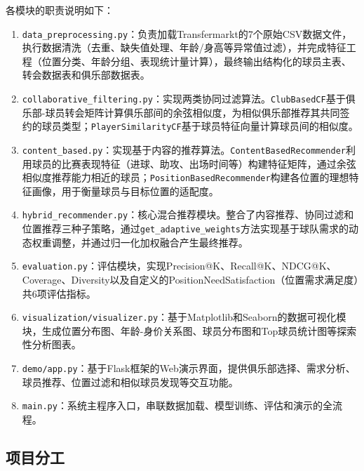 \documentclass[a4paper]{article}
\begin{document}
各模块的职责说明如下：

\begin{enumerate}
    \item \texttt{data\_preprocessing.py}：负责加载Transfermarkt的7个原始CSV数据文件，执行数据清洗（去重、缺失值处理、年龄/身高等异常值过滤），并完成特征工程（位置分类、年龄分组、表现统计量计算），最终输出结构化的球员主表、转会数据表和俱乐部数据表。
    \item \texttt{collaborative\_filtering.py}：实现两类协同过滤算法。\texttt{ClubBasedCF}基于俱乐部-球员转会矩阵计算俱乐部间的余弦相似度，为相似俱乐部推荐其共同签约的球员类型；\texttt{PlayerSimilarityCF}基于球员特征向量计算球员间的相似度。
    \item \texttt{content\_based.py}：实现基于内容的推荐算法。\texttt{ContentBasedRecommender}利用球员的比赛表现特征（进球、助攻、出场时间等）构建特征矩阵，通过余弦相似度推荐能力相近的球员；\texttt{PositionBasedRecommender}构建各位置的理想特征画像，用于衡量球员与目标位置的适配度。
    \item \texttt{hybrid\_recommender.py}：核心混合推荐模块。整合了内容推荐、协同过滤和位置推荐三种子策略，通过\newline\texttt{get\_adaptive\_weights}方法实现基于球队需求的动态权重调整，并通过归一化加权融合产生最终推荐。
    \item \texttt{evaluation.py}：评估模块，实现Precision@K、Recall@K、NDCG@K、Coverage、Diversity以及自定义的PositionNeedSatisfaction（位置需求满足度）共6项评估指标。
    \item \texttt{visualization/visualizer.py}：基于Matplotlib和Seaborn的数据可视化模块，生成位置分布图、年龄-身价关系图、球员分布图和Top球员统计图等探索性分析图表。
    \item \texttt{demo/app.py}：基于Flask框架的Web演示界面，提供俱乐部选择、需求分析、球员推荐、位置过滤和相似球员发现等交互功能。
    \item \texttt{main.py}：系统主程序入口，串联数据加载、模型训练、评估和演示的全流程。
\end{enumerate}

\subsection{项目分工}
\end{document}
